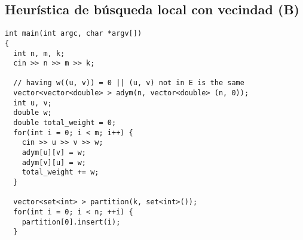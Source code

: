 \newpage

\subsection{Heurística de búsqueda local con vecindad (B)}

\begin{lstlisting}[frame=single, breaklines]
int main(int argc, char *argv[])
{
  int n, m, k;
  cin >> n >> m >> k;

  // having w((u, v)) = 0 || (u, v) not in E is the same 
  vector<vector<double> > adym(n, vector<double> (n, 0));
  int u, v;
  double w;
  double total_weight = 0;
  for(int i = 0; i < m; i++) {
    cin >> u >> v >> w;
    adym[u][v] = w;
    adym[v][u] = w;
    total_weight += w;
  }

  vector<set<int> > partition(k, set<int>());
  for(int i = 0; i < n; ++i) {
    partition[0].insert(i);
  }


\end{lstlisting}
